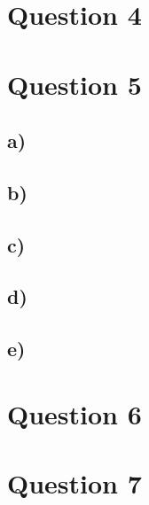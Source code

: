 \documentclass{article}
\begin{document}
\section*{Question 4}

\section*{Question 5}

\subsection*{a)}
\subsection*{b)}
\subsection*{c)}
\subsection*{d)}
\subsection*{e)}

\section*{Question 6}

\section*{Question 7}
\end{document}
